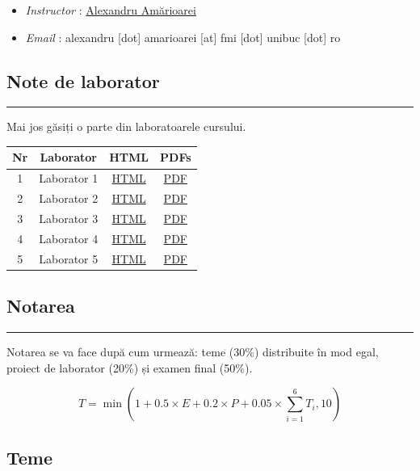 \documentclass[]{article}
\begin{document}
\begin{itemize}
\item
  \emph{Instructor} : \href{https://alexamarioarei.github.io/}{Alexandru
  Amărioarei}
\item
  \emph{Email} : alexandru {[}dot{]} amarioarei {[}at{]} fmi {[}dot{]}
  unibuc {[}dot{]} ro
\end{itemize}

\subsection{Note de laborator}\label{note-de-laborator}

\begin{center}\rule{0.5\linewidth}{\linethickness}\end{center}

Mai jos găsiți o parte din laboratoarele cursului.

\begin{longtable}[]{@{}cccc@{}}
\toprule
Nr & Laborator & HTML & PDFs\tabularnewline
\midrule
\endhead
1 & Laborator 1 & \href{labs/Lab_1.html}{HTML} &
\href{labs/Lab_1_pdf.pdf}{PDF}\tabularnewline
2 & Laborator 2 & \href{labs/Lab_2.html}{HTML} &
\href{labs/Lab_2.pdf}{PDF}\tabularnewline
3 & Laborator 3 & \href{labs/Lab_3.html}{HTML} &
\href{labs/Lab_3.pdf}{PDF}\tabularnewline
4 & Laborator 4 & \href{labs/Lab_4.html}{HTML} &
\href{labs/Lab_4.pdf}{PDF}\tabularnewline
5 & Laborator 5 & \href{labs/Lab_5.html}{HTML} &
\href{labs/Lab_5.pdf}{PDF}\tabularnewline
\bottomrule
\end{longtable}

\subsection{Notarea}\label{notarea}

\begin{center}\rule{0.5\linewidth}{\linethickness}\end{center}

Notarea se va face după cum urmează: teme (30\%) distribuite în mod
egal, proiect de laborator (20\%) și examen final (50\%).

\[
  T = \min\left(1+0.5\times E + 0.2\times P + 0.05\times\sum_{i=1}^{6}T_i, 10\right)
\]

\subsection{Teme}\label{teme}
\end{document}
